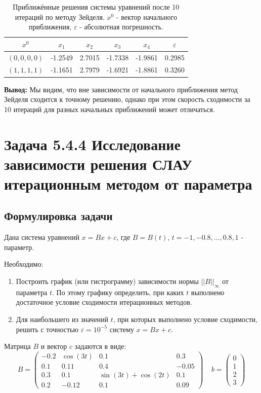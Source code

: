 \documentclass[12pt]{article}%
\begin{document}
\begin{table}[h]
\centering
\begin{tabular}{|c|c|c|c|c|c|}
\hline $x^0$ & $x_1$ & $x_2$ & $x_3$ & $x_4$ & $\varepsilon$ \\
\hline $(0, 0, 0, 0)$ & -1.2549 & 2.7015 & -1.7338 & -1.9861 & 0.2985 \\
\hline $(1, 1, 1, 1)$ & -1.1651 & 2.7979 & -1.6921 & -1.8861 & 0.3260 \\
\hline
\end{tabular}
\caption{Приближённые решения системы уравнений после 10 итераций по методу Зейделя. $x^0$ - вектор начального приближения, $\varepsilon$ - абсолютная погрешность.}
\end{table}

\textbf{Вывод:} Мы видим, что вне зависимости от начального приближения метод Зейделя сходится к точному решению, однако при этом скорость сходимости за 10 итераций для разных начальных приближений может отличаться.  



\newpage
\section{Задача 5.4.4 Исследование зависимости решения СЛАУ итерационным методом от параметра}
\subsection{Формулировка задачи}
Дана система уравнений $x = Bx + c$, где $B = B(t)$, 
$t = -1, -0.8, \dots, 0.8, 1$ - параметр. 

Необходимо:
\begin{enumerate}
    \item Построить график (или гистрограмму) зависимости нормы $||B||_{\infty}$ от параметра $t$. По этому графику определить, при каких $t$ выполнено достаточное условие сходимости итерационных методов.
    \item Для наибольшего из значений $t$, при которых выполнено условие сходимости, решить с точностью $\varepsilon = 10^{-5}$ систему $x = Bx + c$.
\end{enumerate}

Матрица $B$ и вектор $c$ задаются в виде:
\begin{equation*}
B = \begin{pmatrix}
    -0.2 & \cos(3t) & 0.1 & 0.3 \\
    0.1 & 0.11 & 0.4 & -0.05 \\
    0.3 & 0.1 & \sin(3t) + \cos(2t) & 0.1 \\
    0.2 & -0.12 & 0.1 & 0.09
\end{pmatrix}
\ \ \ \ \
b = \begin{pmatrix}
0 \\ 1 \\ 2 \\ 3
\end{pmatrix}
\end{equation*}
\end{document}
